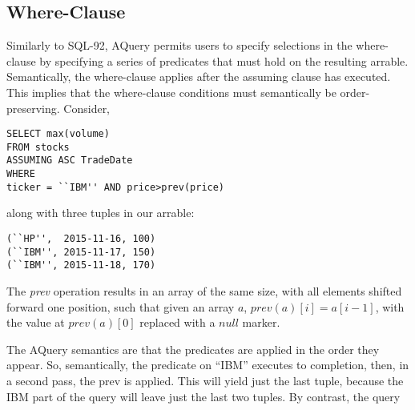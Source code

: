 \documentclass{acm_proc_article-sp}
\begin{document}
\subsection{Where-Clause} \label{where-clause-section}
Similarly to SQL-92, AQuery permits users to specify selections in the where-clause by specifying a series of predicates that must hold on the resulting arrable. Semantically, the where-clause applies after the assuming clause has executed.
This implies that the where-clause conditions must semantically be order-preserving. Consider,


\begin{lstlisting}
SELECT max(volume) 
FROM stocks 
ASSUMING ASC TradeDate 
WHERE 
ticker = ``IBM'' AND price>prev(price)  
\end{lstlisting}

along with three tuples in our arrable:  \\
\begin{lstlisting}
(``HP'',  2015-11-16, 100) 
(``IBM'', 2015-11-17, 150) 
(``IBM'', 2015-11-18, 170) 
\end{lstlisting}

The \textit{prev} operation results in an array of the same size, with all elements shifted forward one position, such that given an array $a$, $prev(a)[i] = a[i - 1]$, with the value at $prev(a)[0]$ replaced with a $null$ marker.



The AQuery semantics are that the predicates 
are applied in the order they appear.
So, semantically, the predicate on ``IBM'' executes to completion, then,
in a second pass,
the prev is applied.
This will yield just the last tuple, because the IBM part of the query
will leave just the last two tuples.
By contrast,
the query
\end{document}
